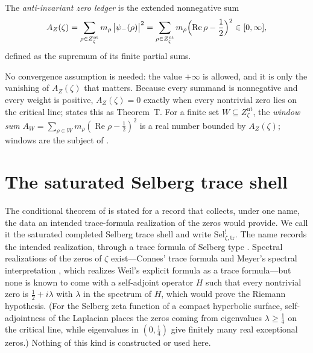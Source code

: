 \documentclass[11pt]{article}
\DeclareMathOperator{\Real}{Re}
\newcommand{\psimRH}{\psi_{-}}
\newcommand{\Znt}{Z_{\zeta}^{\mathrm{nt}}}
\newcommand{\AZ}{A_{Z}(\zeta)}
\newcommand{\Sel}{\mathrm{Sel}^{!}_{\zeta,\mathrm{tr}}}
\theoremstyle{definition}
\begin{document}
\begin{definition}
\label{def:rh:anti-invariant-zero-ledger}
The \emph{anti-invariant zero ledger} is the extended nonnegative sum
\[
  \AZ=\sum_{\rho\in\Znt}m_\rho\,\bigl|\psimRH(\rho)\bigr|^2
     =\sum_{\rho\in\Znt}m_\rho\Bigl(\Real\rho-\frac12\Bigr)^2
  \in[0,\infty],
\]
defined as the supremum of its finite partial sums.
\end{definition}

No convergence assumption is needed: the value \(+\infty\) is allowed,
and it is only the vanishing of \(\AZ\) that matters.  Because every
summand is nonnegative and every weight is positive, \(\AZ=0\) exactly
when every nontrivial zero lies on the critical line;
 states this as Theorem~T.  For a finite
set \(W\subseteq\Znt\), the \emph{window sum}
\(A_W=\sum_{\rho\in W}m_\rho(\Real\rho-\frac12)^2\) is a real number
bounded by \(\AZ\); windows are the subject of
.
 \section{The saturated Selberg trace shell}
\label{sec:sat_sel_shell}

The conditional theorem of  is stated for a
record that collects, under one name, the data an intended
trace-formula realization of the zeros would provide.  We call it the
saturated completed Selberg trace shell and write \(\Sel\).  The name records the intended realization, through a trace formula of
Selberg type \citep{Selberg1956,Hejhal1976,Iwaniec2002}.  Spectral realizations of the zeros of \(\zeta\) exist---Connes' trace
formula \citep{Connes1999} and Meyer's spectral interpretation
\citep{Meyer2005}, which realizes Weil's explicit formula
\citep{Weil1952} as a trace formula---but none is known to come with a self-adjoint operator \(H\) such that
every nontrivial zero is \(\frac12+i\lambda\) with \(\lambda\) in the spectrum
of \(H\), which would prove the Riemann hypothesis.  (For the Selberg zeta function of a compact hyperbolic
surface, self-adjointness of the Laplacian places the zeros coming from
eigenvalues \(\lambda\geq\frac14\) on the critical line, while eigenvalues
in \((0,\frac14)\) give finitely many real exceptional zeros.)  Nothing of this kind is constructed or used here.
\end{document}
